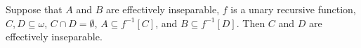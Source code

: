 Suppose that $A$ and $B$ are effectively inseparable, $f$ is a unary recursive function, $C, D \subseteq \omega$, $C \cap D = \emptyset$, $A \subseteq f^{-1}[C]$, and $B \subseteq f^{-1}[D]$. Then $C$ and $D$ are effectively inseparable.
